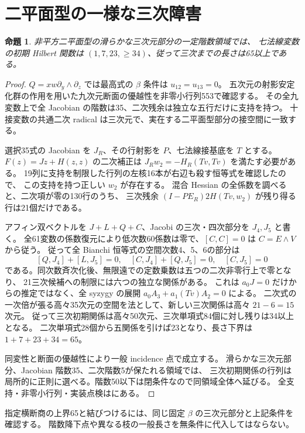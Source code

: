 \documentclass[11pt,a4paper]{ltjsarticle}
\newtheorem{proposition}[theorem]{命題}
\theoremstyle{remark}
\begin{document}
\section{二平面型の一様な三次障害}
\begin{proposition}\label{prop:binary-lower-v35}
非平方二平面型の滑らかな三次元部分の一定階数領域では、
七法線変数の初期 Hilbert 関数は $(1,7,23,\ge34)$、従って三次までの長さは65以上である。
\end{proposition}
\begin{proof}
$Q=xw\partial_y\wedge\partial_z$ では最高式の $\beta$ 条件は $u_{12}=u_{13}=0$。
五次元の射影安定化群の作用を用いた九次元断面の優越性を非零小行列553で確認する。
その全九変数上で全 Jacobian の階数は35、二次残余は独立な五行だけに支持を持つ。
十接変数の共通二次 radical は三次元で、実在する二平面型部分の接空間に一致する。

選択35式の Jacobian を $J_R$、その行射影を $P$、七法線接基底を $T$ とする。
$F(z)=Jz+H(z,z)$ の二次補正は $J_Rw_2=-H_R(Tv,Tv)$ を満たす必要がある。
19列に支持を制限した行列の左核16本が右辺も殺す恒等式を確認したので、
この支持を持つ正しい $w_2$ が存在する。
混合 Hessian の全係数を調べると、二次項が零の130行のうち、
三次残余 $(I-PE_R)2H(Tv,w_2)$ が残り得る行は21個だけである。

アフィン双ベクトルを $J+L+Q+C$、Jacobi の三次・四次部分を $J_4,J_5$ と書く。
全61変数の係数復元により低次数60係数は零で、$[C,C]=0$ は $C=E\wedge V$ から従う。
従って全 Bianchi 恒等式の空間次数4、5、6の部分は
\[
 [Q,J_4]+[L,J_5]=0,\quad [C,J_4]+[Q,J_5]=0,\quad [C,J_5]=0
\]
である。同次数斉次化後、無限遠での定数乗数は五つの二次非零行上で零となり、
21三次候補への制限には六つの独立な関係がある。
これは $a_0J=0$ だけからの推定ではなく、全 syzygy の展開
$a_0A_3+a_1(Tv)A_2=0$ による。
二次式の一次倍が張る高々35次元の空間を法として、新しい三次関係は高々 $21-6=15$ 次元。
従って三次初期関係は高々50次元、三次単項式84個に対し残りは34以上となる。
二次単項式28個から五関係を引けば23となり、長さ下界は $1+7+23+34=65$。

同変性と断面の優越性により一般 incidence 点で成立する。
滑らかな三次元部分、Jacobian 階数35、二次階数5が保たれる領域では、
三次初期関係の行列は局所的に正則に選べる。階数50以下は閉条件なので同領域全体へ延びる。
全支持・非零小行列・実装点検は\cite{binary-uniform-v35}にある。
\end{proof}
指定横断商の上界65と結びつけるには、同じ固定 $\beta$ の三次元部分と上記条件を確認する。
階数降下点や異なる枝の一般長さを無条件に代入してはならない。
\end{document}
